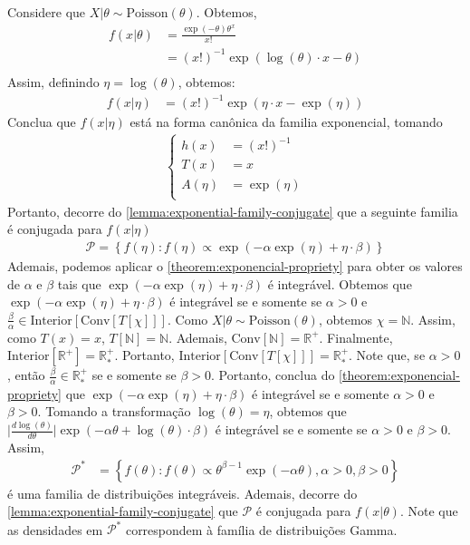 \begin{example}
 Considere que
 $X|\theta \sim \text{Poisson}(\theta)$. Obtemos,
 \begin{align*}
  f(x|\theta)
  &= \frac{\exp(-\theta)\theta^{x}}{x!} \\
  &= (x!)^{-1} \exp(\log(\theta) \cdot x - \theta) \\
 \end{align*}
 Assim, definindo $\eta = \log(\theta)$, obtemos:
 \begin{align*}
  f(x|\eta)
  &= (x!)^{-1} \exp(\eta \cdot x - \exp(\eta))
 \end{align*}
 Conclua que $f(x|\eta)$ está na
 forma canônica da familia exponencial, tomando
 \begin{align*} 
  \begin{cases}
   h(x) &= (x!)^{-1} \\
   T(x) &= x \\
   A(\eta) &= \exp(\eta) \\
  \end{cases}
 \end{align*}
 Portanto, decorre do
 \cref{lemma:exponential-family-conjugate} que
 a seguinte familia é conjugada para $f(x|\eta)$
 \begin{align*}
  \mathcal{P} = \left\{f(\eta): f(\eta) \propto \exp(-\alpha\exp(\eta) + \eta \cdot \beta) \right\}
 \end{align*}
 Ademais, podemos aplicar o
 \cref{theorem:exponencial-propriety} para
 obter os valores de $\alpha$ e $\beta$ tais que
 $\exp(-\alpha\exp(\eta) + \eta \cdot \beta)$ é
 integrável. Obtemos que $\exp(-\alpha\exp(\eta) + \eta \cdot \beta)$ é integrável se e somente se
 $\alpha > 0$ e $\frac{\beta}{\alpha} \in \text{Interior}[\text{Conv}[T[\chi]]]$.
 Como $X|\theta \sim \text{Poisson}(\theta)$, obtemos
 $\chi = \mathbb{N}$.
 Assim, como $T(x) = x$, $T[\mathbb{N}] = \mathbb{N}$.
 Ademais, $\text{Conv}[\mathbb{N}] = \mathbb{R}^{+}$.
 Finalmente, $\text{Interior}[\mathbb{R}^+] = \mathbb{R}^{+}_{*}$.
 Portanto, $\text{Interior}[\text{Conv}[T[\chi]]] = \mathbb{R}^{+}_{*}$.
 Note que, se $\alpha > 0$, então
 $\frac{\beta}{\alpha} \in \mathbb{R}^{+}_{*}$
 se e somente se $\beta > 0$.
 Portanto, conclua do \cref{theorem:exponencial-propriety} que 
 $\exp(-\alpha\exp(\eta) + \eta \cdot \beta)$ é
 integrável se e somente $\alpha > 0$ e $\beta > 0$.
 Tomando a transformação $\log(\theta) = \eta$,
 obtemos que 
 $\big|\frac{d\log(\theta)}{d\theta}\big| \exp(-\alpha\theta + \log(\theta) \cdot \beta)$ é
 integrável se e somente se
 $\alpha > 0$ e $\beta > 0$. Assim,
 \begin{align*} 
  \mathcal{P}^{*} &= \left\{f(\theta):
  f(\theta) \propto \theta^{\beta-1}\exp(-\alpha \theta), \alpha > 0, \beta > 0\right\}
 \end{align*}
 é uma familia de distribuições integráveis.
 Ademais, decorre do
 \cref{lemma:exponential-family-conjugate} que
 $\mathcal{P}$ é conjugada para $f(x|\theta)$.
 Note que as densidades em $\mathcal{P}^{*}$
 correspondem à família de distribuições Gamma.
\end{example}

